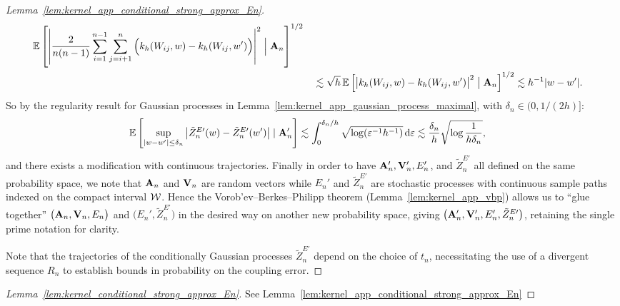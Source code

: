 \begin{proof}[Lemma~\ref{lem:kernel_app_conditional_strong_approx_En}]
\begin{align*}
    \mathbb{E}\left[
      \left|
      \frac{2}{n(n-1)}
      \sum_{i=1}^{n-1}
      \sum_{j=i+1}^{n}
      \Big(
        k_h(W_{i j},w)
        - k_h(W_{i j},w')
      \Big)
      \right|^2
      \Bigm\vert \mathbf{A}_n
    \right]^{1/2} \\
    &\quad\lesssim
    \sqrt{h} \,
    \mathbb{E}\left[
      \big|
      k_h(W_{i j},w)
      - k_h(W_{i j},w')
      \big|^2
      \bigm\vert \mathbf{A}_n
    \right]^{1/2}
    \lesssim
    h^{-1} |w-w'|.
  \end{align*}
  So by the regularity result for Gaussian processes in
  Lemma~\ref{lem:kernel_app_gaussian_process_maximal},
  with $\delta_n \in (0, 1/(2h)]$:
  \begin{align*}
    \mathbb{E}\left[
      \sup_{|w-w'| \leq \delta_n}
      \big|
      \tilde Z_n^{E\prime}(w)
      - \tilde Z_n^{E\prime}(w')
      \big|
      \mid \mathbf{A}_n'
    \right]
    &\lesssim
    \int_0^{\delta_n/h}
    \sqrt{\log (\varepsilon^{-1} h^{-1})}
    \,\mathrm{d}\varepsilon
    \lesssim
    \frac{\delta_n}{h}
    \sqrt{\log \frac{1}{h\delta_n}},
  \end{align*}
  and there exists a modification with continuous trajectories.
  Finally in order to have $\mathbf{A}_n', \mathbf{V}_n', E_n'$, and $\tilde Z_n^{E\prime}$
  all defined on the same probability space,
  we note that $\mathbf{A}_n$ and $\mathbf{V}_n$ are random vectors
  while $E_n'$ and $\tilde Z_n^{E\prime}$ are stochastic processes
  with continuous sample paths indexed on the compact interval $\mathcal{W}$.
  Hence the Vorob'ev--Berkes--Philipp theorem (Lemma~\ref{lem:kernel_app_vbp})
  allows us to ``glue together'' $\big(\mathbf{A}_n, \mathbf{V}_n, E_n\big)$
  and $\big(E_n', \tilde Z_n^{E\prime}\big)$
  in the desired way on another new probability space, giving
  $\big(\mathbf{A}_n', \mathbf{V}_n', E_n', \tilde Z_n^{E\prime}\big)$,
  retaining the single prime notation for clarity.

  Note that the trajectories of the conditionally Gaussian processes
  $\tilde Z_n^{E\prime}$ depend on the choice of $t_n$,
  necessitating the use of a divergent sequence $R_n$ to establish
  bounds in probability on the coupling error.
\end{proof}

\begin{proof}[Lemma~\ref{lem:kernel_conditional_strong_approx_En}]
  See Lemma~\ref{lem:kernel_app_conditional_strong_approx_En}
\end{proof}

